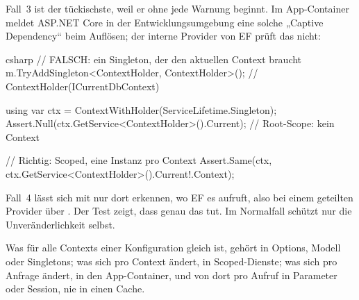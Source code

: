Fall~3 ist der tückischste, weil er ohne jede Warnung beginnt. Im App-Container meldet
ASP.NET Core in der Entwicklungsumgebung eine solche „Captive Dependency“ beim Auflösen; der
interne Provider von EF prüft das nicht:

\begin{sourcecode}{csharp}
// FALSCH: ein Singleton, der den aktuellen Context braucht
m.TryAddSingleton<ContextHolder, ContextHolder>();     // ContextHolder(ICurrentDbContext)

using var ctx = ContextWithHolder(ServiceLifetime.Singleton);
Assert.Null(ctx.GetService<ContextHolder>().Current);  // Root-Scope: kein Context

// Richtig: Scoped, eine Instanz pro Context
Assert.Same(ctx, ctx.GetService<ContextHolder>().Current!.Context);
\end{sourcecode}

Fall~4 lässt sich mit  nur dort
erkennen, wo EF es aufruft, also bei einem geteilten Provider über
. Der Test
zeigt, dass  genau das tut. Im
Normalfall schützt nur die Unveränderlichkeit selbst.

\begin{important}
  Was für alle Contexts einer Konfiguration gleich ist, gehört in Options, Modell oder
  Singletons; was sich pro Context ändert, in Scoped-Dienste; was sich pro Anfrage ändert,
  in den App-Container, und von dort pro Aufruf in Parameter oder Session, nie in einen
  Cache.
\end{important}
